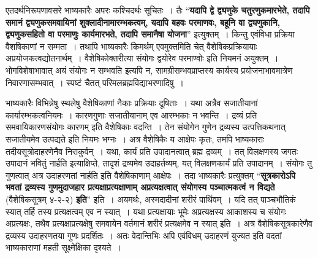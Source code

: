 {एतदर्थनिरूपणावसरे भाष्यकारैः अपरः कश्चिदर्थः सूचितः~। तैः “\textbf{यदापि द्वे द्व्यणुके चतुरणुकमारभेते, तदापि समानं द्व्यणुकसमवायिनां शुक्लादीनामारम्भकत्वम्, यदापि बहवः परमाणवः, बहूनि वा द्व्यणुकानि, द्व्यणुकसहितो वा परमाणुः कार्यमारभते, तदापि समानैषा योजना}” इत्युक्तम्~। किन्तु एवंविधा प्रक्रिया वैशषिकाणां न सम्मता~। तथापि भाष्यकारैः किमर्थम् एवमुक्तमिति चेत् वैशेषिकप्रक्रियायाः अप्रयोजकत्वद्योतनार्थम्~। वैशेषिकोक्तरीत्या संयोगः द्वयोरेव परमाण्वोः इति नियमनं अयुक्तम्~। भोगविशेषाभावात् अयं संयोगः न सम्भवति इत्यपि न, सामग्रीसम्भवप्राप्तस्य कार्यस्य प्रयोजनाभावमात्रेण निवारणासम्भवात्~। स्पष्टं चैतत् परिमलब्रह्मविद्याभरणादिषु~। 

भाष्यकारैः विभिन्नेषु स्थलेषु वैशेषिकाणां नैकाः प्रक्रियाः दूषिताः~। यथा अत्रैव सजातीयानां कार्यारम्भकत्वनियमः~। कारणगुणाः सजातीयानाम् एव आरम्भकाः न भवन्ति~। द्रव्यं प्रति समवायिकारणसंयोगः कारणम् इति वैशेषिकाः वदन्ति~। तेन संयोगेन गुणेन द्रव्यस्य उत्पत्तिकथनात् सजातीयमेव उत्पद्यते इति नियमः भग्नः~। अत्र वैशेषिकैः य आक्षेपः कृतः, तमपि भाष्यकाराः तदीयसूत्रोदाहरणेनैव निराकुर्वन्~। यथा, कार्यं प्रति उपादानत्वात् ब्रह्म द्रव्यम्~। तत् विलक्षणस्य जगतः उपादानं भवितुं नार्हति इत्याक्षिप्ते, तादृशं द्रव्यमेव उदाहर्तव्यम्, यत् विलक्षणकार्यं प्रति उपादानम्~। संयोगः तु गुणत्वात् अत्र उदाहरणतां नार्हति इति वैशेषिकाणाम् आक्षेपः~। तदा भाष्यकारैः प्रत्युक्तम् “\textbf{सूत्रकारोऽपि भवतां द्रव्यस्य गुणमुदाजहार प्रत्यक्षाप्रत्यक्षाणाम् अप्रत्यक्षत्वात् संयोगस्य पञ्चात्मकत्वं न विद्यते} (वैशेषिकसूत्रम् ४-२-२) \textbf{इति}” इति~। अयमर्थः, अस्मदादीनां शरीरं पार्थिवम्~। यदि तत् पाञ्चभौतिकं स्यात् तर्हि तस्य प्रत्यक्षत्वम् एव न स्यात्~। यथा प्रत्यक्षायाः भूमेः अप्रत्यक्षस्य आकाशस्य च संयोगः अप्रत्यक्षः, तथैव प्रत्यक्षाप्रत्यक्षेषु समवायेन वर्तमानं शरीरं प्रत्यक्षमेव न स्यात् इति~। अत्र वैशेषिकसूत्रकारेणैव द्रव्यस्य उदाहरणतया गुणः प्रदर्शितः~। अतः वेदान्तिभिः अपि एवंविधम् उदाहरणं युज्यत इति वदतां भाष्यकाराणां महती सूक्ष्मेक्षिका दृश्यते~। 

}
